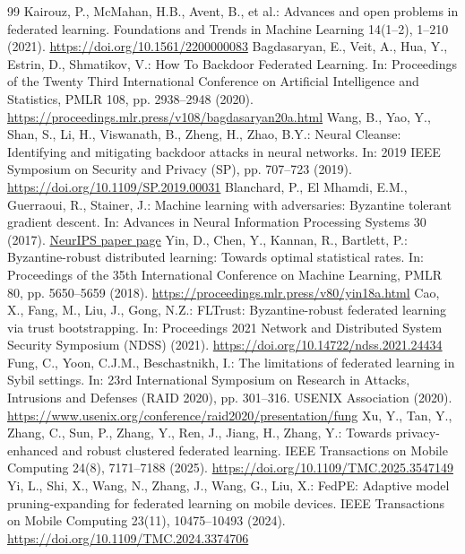 \documentclass[11pt, a4paper, UTF8, fontset=fandol]{ctexart}
\begin{document}
\begin{thebibliography}{99}
     Kairouz, P., McMahan, H.B., Avent, B., et al.: Advances and open problems in federated learning. Foundations and Trends in Machine Learning 14(1--2), 1--210 (2021). \url{https://doi.org/10.1561/2200000083}
     Bagdasaryan, E., Veit, A., Hua, Y., Estrin, D., Shmatikov, V.: How To Backdoor Federated Learning. In: Proceedings of the Twenty Third International Conference on Artificial Intelligence and Statistics, PMLR 108, pp. 2938--2948 (2020). \url{https://proceedings.mlr.press/v108/bagdasaryan20a.html}
     Wang, B., Yao, Y., Shan, S., Li, H., Viswanath, B., Zheng, H., Zhao, B.Y.: Neural Cleanse: Identifying and mitigating backdoor attacks in neural networks. In: 2019 IEEE Symposium on Security and Privacy (SP), pp. 707--723 (2019). \url{https://doi.org/10.1109/SP.2019.00031}
     Blanchard, P., El Mhamdi, E.M., Guerraoui, R., Stainer, J.: Machine learning with adversaries: Byzantine tolerant gradient descent. In: Advances in Neural Information Processing Systems 30 (2017). \href{https://papers.nips.cc/paper/6617-machine-learning-with-adversaries-byzantine-tolerant-gradient-descent}{NeurIPS paper page}
     Yin, D., Chen, Y., Kannan, R., Bartlett, P.: Byzantine-robust distributed learning: Towards optimal statistical rates. In: Proceedings of the 35th International Conference on Machine Learning, PMLR 80, pp. 5650--5659 (2018). \url{https://proceedings.mlr.press/v80/yin18a.html}
     Cao, X., Fang, M., Liu, J., Gong, N.Z.: FLTrust: Byzantine-robust federated learning via trust bootstrapping. In: Proceedings 2021 Network and Distributed System Security Symposium (NDSS) (2021). \url{https://doi.org/10.14722/ndss.2021.24434}
     Fung, C., Yoon, C.J.M., Beschastnikh, I.: The limitations of federated learning in Sybil settings. In: 23rd International Symposium on Research in Attacks, Intrusions and Defenses (RAID 2020), pp. 301--316. USENIX Association (2020). \url{https://www.usenix.org/conference/raid2020/presentation/fung}
     Xu, Y., Tan, Y., Zhang, C., Sun, P., Zhang, Y., Ren, J., Jiang, H., Zhang, Y.: Towards privacy-enhanced and robust clustered federated learning. IEEE Transactions on Mobile Computing 24(8), 7171--7188 (2025). \url{https://doi.org/10.1109/TMC.2025.3547149}
     Yi, L., Shi, X., Wang, N., Zhang, J., Wang, G., Liu, X.: FedPE: Adaptive model pruning-expanding for federated learning on mobile devices. IEEE Transactions on Mobile Computing 23(11), 10475--10493 (2024). \url{https://doi.org/10.1109/TMC.2024.3374706}

\end{thebibliography}
\end{document}
